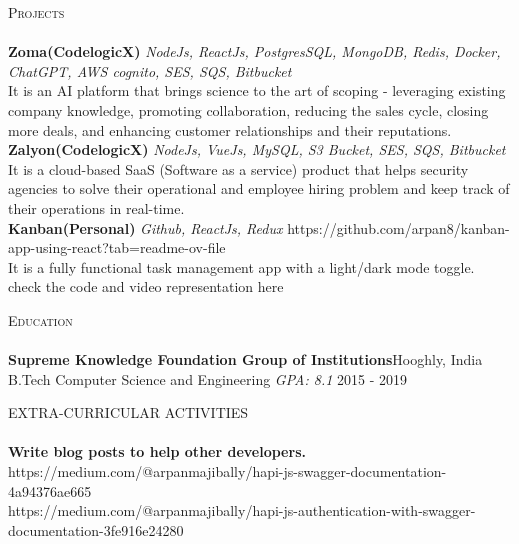 \documentclass[a4paper]{article}
\newcommand{\lineunder} {
    \vspace*{-8pt} \\
    \hspace*{-18pt} \hrulefill \\
}
\newcommand{\header} [1] {
    {\hspace*{-18pt}\vspace*{6pt} \textsc{#1}}
    \vspace*{-6pt} \lineunder
}
\begin{document}
\header{Projects}
{\textbf{Zoma(CodelogicX)}} {\sl NodeJs, ReactJs, PostgresSQL, MongoDB, Redis, Docker, ChatGPT, AWS cognito, SES, SQS, Bitbucket} \\
It is an AI platform that brings science to the art of scoping - leveraging existing company knowledge, promoting collaboration, reducing the sales cycle, closing more deals, and enhancing customer relationships and their reputations.\\
\vspace*{2mm}
{\textbf{Zalyon(CodelogicX)}} {\sl NodeJs, VueJs, MySQL, S3 Bucket, SES, SQS, Bitbucket} \\
It is a cloud-based SaaS (Software as a service) product that helps security agencies to solve their operational and employee hiring problem and keep track of their operations in real-time.\\
\vspace*{2mm}
{\textbf{Kanban(Personal)}} {\sl Github, ReactJs, Redux} \hfill https://github.com/arpan8/kanban-app-using-react?tab=readme-ov-file\\
It is a fully functional task management app with a light/dark mode toggle. check the code and video representation here\\
\vspace*{2mm}

\header{Education}
\textbf{Supreme Knowledge Foundation Group of Institutions}\hfill Hooghly, India\\
B.Tech Computer Science and Engineering \textit{GPA: 8.1} \hfill 2015 - 2019\\
\vspace{2mm}

\header{EXTRA-CURRICULAR ACTIVITIES}
\textbf{Write blog posts to help other developers.} \hfill https://medium.com/@arpanmajibally/hapi-js-swagger-documentation-4a94376ae665\\
https://medium.com/@arpanmajibally/hapi-js-authentication-with-swagger-documentation-3fe916e24280\\
\vspace*{2mm}

\ 
\end{document}
